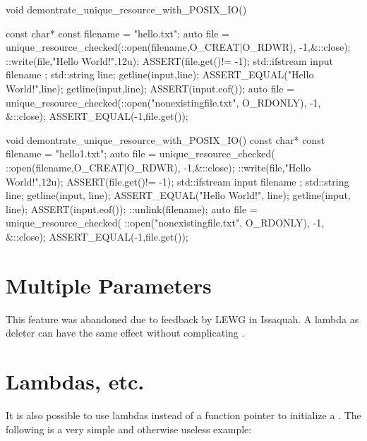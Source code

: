 \documentclass[ebook,11pt,article]{memoir}
\begin{document}
\begin{codeblock}
void demontrate_unique_resource_with_POSIX_IO(){
	const char* const filename = "hello.txt";
	{
		auto file = unique_resource_checked(::open(filename,O_CREAT|O_RDWR),
				 -1,&::close);
		::write(file,"Hello World!\n",12u);
		ASSERT(file.get()!= -1);
	}
	std::ifstream input { filename };
	std::string line;
	getline(input,line);
	ASSERT_EQUAL("Hello World!",line);
	getline(input,line);
	ASSERT(input.eof());
	{
		auto file = unique_resource_checked(::open("nonexistingfile.txt", O_RDONLY),
				-1, &::close);
		ASSERT_EQUAL(-1,file.get());
	}

}
\end{codeblock}
\begin{codeblock}
void demontrate_unique_resource_with_POSIX_IO(){
	const char* const filename = "hello1.txt";
	{
		auto file = unique_resource_checked(
				::open(filename,O_CREAT|O_RDWR),
				 -1,&::close);
		::write(file,"Hello World!\n",12u);
		ASSERT(file.get()!= -1);
	}
	{
		std::ifstream input { filename };
		std::string line;
		getline(input, line);
		ASSERT_EQUAL("Hello World!", line);
		getline(input, line);
		ASSERT(input.eof());
	}
	::unlink(filename);
	{
		auto file = unique_resource_checked(
				::open("nonexistingfile.txt", O_RDONLY),
				-1,
				&::close);
		ASSERT_EQUAL(-1,file.get());
	}
}
\end{codeblock}

\section{Multiple Parameters}
This feature was abandoned due to feedback by LEWG in Issaquah. A lambda as deleter can have the same effect without complicating .

\section{Lambdas, etc.}
It is also possible to use lambdas instead of a function pointer to initialize a .  The following is a very simple and otherwise useless example:
\end{document}
